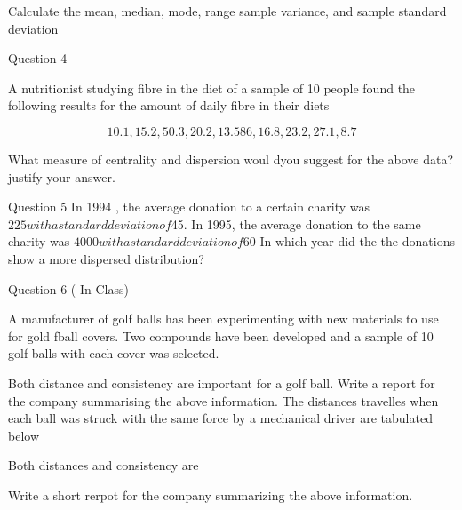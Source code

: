 
Calculate the mean, median, mode, range sample variance, and sample standard deviation

Question 4

A nutritionist studying fibre in the diet of a sample of 10 people found the following results for the amount of daily fibre in their diets

\[ 10.1,15.2,50.3,20.2,13.586,16.8,23.2,27.1,8.7\]

What measure of centrality and dispersion woul dyou suggest for the above data? justify your answer.

Question 5
In 1994 , the average donation to a certain charity was $225 with a standard deviation of $45.
In 1995, the average donation to the same charity was $4000 with a standard deviation of $60
In which year did the the donations show a more dispersed distribution?


Question 6 ( In Class) 

A manufacturer of golf balls has been experimenting with new materials to use for gold fball covers.
Two compounds have been developed and a sample of 10 golf balls with each cover was selected.



Both distance and consistency are important for a golf ball. Write a report for the company summarising the above information.
The distances travelles when each ball was struck with the same force by a mechanical driver are tabulated below

Both distances and consistency are 

Write a short rerpot for the company summarizing the above information.

